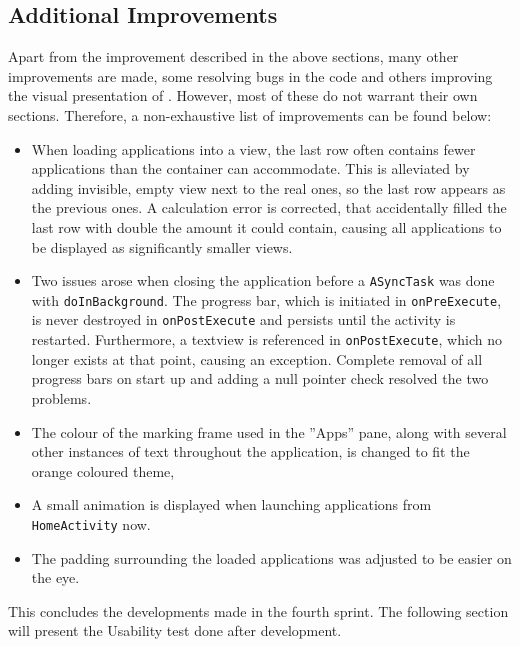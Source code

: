 \subsection{Additional Improvements}

Apart from the improvement described in the above sections, many other improvements are made, some resolving bugs in the code and others improving the visual presentation of \launcher.
However, most of these do not warrant their own sections.
Therefore, a non-exhaustive list of improvements can be found below:

\begin{itemize}
\item When loading applications into a view, the last row often contains fewer applications than the container can accommodate.
This is alleviated by adding invisible, empty view next to the real ones, so the last row appears as the previous ones.
A calculation error is corrected, that accidentally filled the last row with double the amount it could contain, causing all applications to be displayed as significantly smaller views.
\item Two issues arose when closing the application before a \lstinline|ASyncTask| was done with \lstinline|doInBackground|.
The progress bar, which is initiated in \lstinline|onPreExecute|, is never destroyed in \lstinline|onPostExecute| and persists until the activity is restarted.
Furthermore, a textview is referenced in \lstinline|onPostExecute|, which no longer exists at that point, causing an exception.
Complete removal of all progress bars on start up and adding a null pointer check resolved the two problems.
\item The colour of the marking frame used in the ''Apps'' pane, along with several other instances of text throughout the application, is changed to fit the orange coloured theme,
\item A small animation is displayed when launching applications from \lstinline|HomeActivity| now.
\item The padding surrounding the loaded applications was adjusted to be easier on the eye.
\end{itemize}

This concludes the developments made in the fourth sprint.
The following section will present the Usability test done after development.